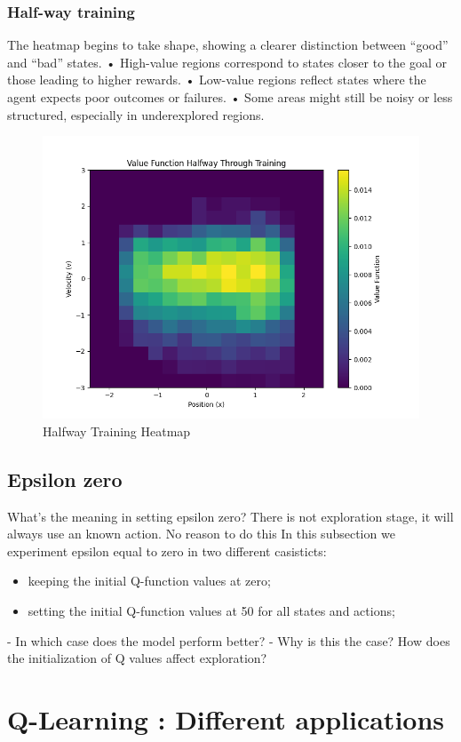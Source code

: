 \documentclass{article}
\begin{document}
\subsubsection{Half-way training}
The heatmap begins to take shape, showing a clearer distinction between “good” and “bad” states.
•	High-value regions correspond to states closer to the goal or those leading to higher rewards.
•	Low-value regions reflect states where the agent expects poor outcomes or failures.
•	Some areas might still be noisy or less structured, especially in underexplored regions.
\begin{figure}[h]
	\centering
	\includegraphics[width=0.5\linewidth]{../data/plot/heatmap_halfway_constant_0.2.png}
	\caption{Halfway Training Heatmap}
	\label{fig:plot1}
\end{figure}


\subsection{Epsilon zero}
What's the meaning in setting epsilon zero? There is not exploration stage, it will always use an known action. No reason to do this
In this subsection we experiment epsilon equal to zero in two different casisticts:
\begin{itemize}
	\item keeping the initial Q-function values at zero;
	\item setting the initial Q-function values at 50 for all states and actions;
\end{itemize}

- In which case does the model perform better?
- Why is this the case? How does the initialization of Q values aﬀect exploration?

\section{Q-Learning : Different applications}
\end{document}
